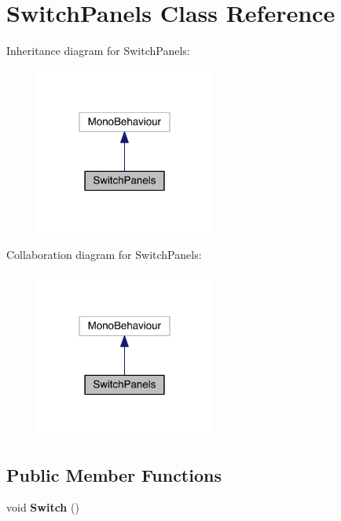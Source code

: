 \hypertarget{class_switch_panels}{}\section{Switch\+Panels Class Reference}
\label{class_switch_panels}


Inheritance diagram for Switch\+Panels\+:\nopagebreak
\begin{figure}[H]
\begin{center}
\leavevmode
\includegraphics[width=166pt]{class_switch_panels__inherit__graph}
\end{center}
\end{figure}


Collaboration diagram for Switch\+Panels\+:\nopagebreak
\begin{figure}[H]
\begin{center}
\leavevmode
\includegraphics[width=166pt]{class_switch_panels__coll__graph}
\end{center}
\end{figure}
\subsection*{Public Member Functions}
\begin{DoxyCompactItemize}
\item 
void {\bfseries Switch} ()\hypertarget{class_switch_panels_ace2a96d84a27000e6e5586078c29edf4}{}\label{class_switch_panels_ace2a96d84a27000e6e5586078c29edf4}

\end{DoxyCompactItemize}
